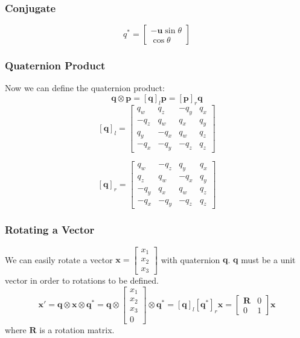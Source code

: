 \documentclass[11pt]{article}
\renewcommand{\vec}[1]{\mathbf{#1}}
\newcommand{\mat}[1]{\mathbf{#1}}
\begin{document}
\subsubsection{Conjugate}
$$q^* = \begin{bmatrix}
-\vec{u}\sin\theta\\
\cos\theta
\end{bmatrix}$$

\subsubsection{Quaternion Product}
Now we can define the quaternion product:
$$\vec{q} \otimes \vec{p} = [\vec{q}]_l\vec{p} = [\vec{p}]_r\vec{q}$$
$$[\vec{q}]_l = \begin{bmatrix}
q_w & q_z & -q_y & q_x\\
-q_z & q_w & q_x & q_y\\
q_y & -q_x & q_w & q_z\\
-q_x & -q_y & -q_z & q_z 
\end{bmatrix}$$

$$[\vec{q}]_r = \begin{bmatrix}
q_w & -q_z & q_y & q_x\\
q_z & q_w & -q_x & q_y\\
-q_y & q_x & q_w & q_z\\
-q_x & -q_y & -q_z & q_z 
\end{bmatrix}$$

\subsubsection{Rotating a Vector}
We can easily rotate a vector $\vec{x} = \begin{bmatrix}
x_1\\ x_2\\ x_3
\end{bmatrix}$ with quaternion $\vec{q}$. $\vec{q}$ must be a unit vector in order to rotations to be defined.
$$\vec{x}' = \vec{q} \otimes \vec{x} \otimes \vec{q}^* = \vec{q} \otimes \begin{bmatrix}
x_1\\ x_2\\ x_3\\ 0
\end{bmatrix} \otimes \vec{q}^* = [\vec{q}]_l[\vec{q}^*]_r\vec{x} = \begin{bmatrix}
\mat{R} & 0\\
0 & 1
\end{bmatrix}\vec{x}$$ where $\mat{R}$ is a rotation matrix.
\end{document}
